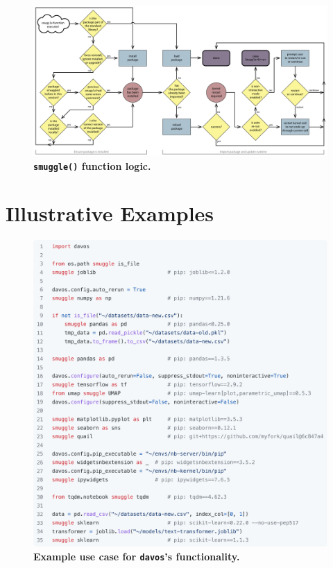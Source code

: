 \documentclass[preprint,12pt,a4paper]{elsarticle}
\begin{document}
\begin{figure}[tp]
\centering
\includegraphics[width=\textwidth]{figs/flow_chart}
\caption{\small \textbf{\texttt{smuggle()} function logic.} }
\label{fig:flow-chart}
\end{figure}



\section{Illustrative Examples}

\begin{figure}[tp]
\centering
\includegraphics[width=\textwidth]{figs/illustrative_example}
\caption{\small \textbf{Example use case for \texttt{davos}'s functionality.}}
\label{fig:illustrative-example}
\end{figure}
\end{document}
